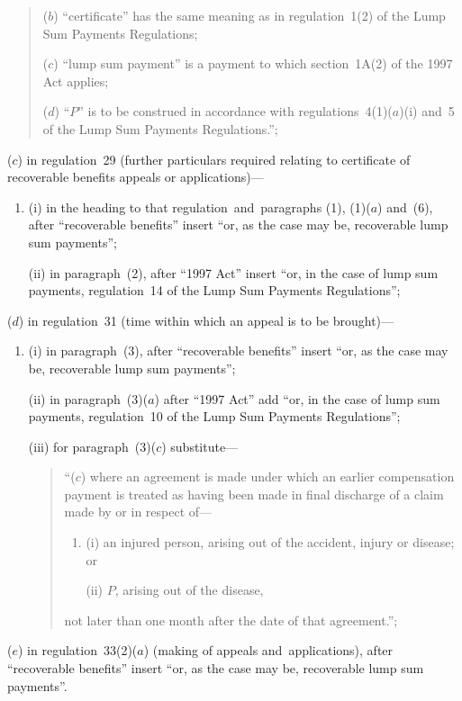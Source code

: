\documentclass[12pt,a4paper]{article}
\begin{document}
\begin{enumerate}
\begin{quotation}
\begin{enumerate}
($b$) “certificate” has the same meaning as in regulation~1(2) of the Lump Sum Payments Regulations;

($c$) “lump sum payment” is a payment to which section~1A(2) of the 1997 Act  applies;

($d$) “$P$” is to be construed in accordance with regulations~4(1)($a$)(i)  and~5 of the Lump Sum Payments Regulations.”;
\end{enumerate}
\end{quotation}

($c$) in regulation~29 (further particulars required relating to certificate of recoverable benefits appeals or applications)—
\begin{enumerate}\item[]
(i) in the heading to that regulation~and~paragraphs (1), (1)($a$)  and~(6), after “recoverable benefits” insert “or, as the case may be, recoverable lump sum payments”;

(ii) in paragraph~(2), after “1997 Act” insert “or, in the case of lump sum payments, regulation~14 of the Lump Sum Payments Regulations”;
\end{enumerate}

($d$) in regulation~31 (time within which an appeal is to be brought)—
\begin{enumerate}\item[]
(i) in paragraph~(3), after “recoverable benefits” insert “or, as the case may be, recoverable lump sum payments”;

(ii) in paragraph~(3)($a$)  after “1997 Act” add “or, in the case of lump sum payments, regulation~10 of the Lump Sum Payments Regulations”;

(iii) for paragraph~(3)($c$)  substitute—
\begin{quotation}
“($c$) where an agreement is made under which an earlier compensation payment is treated as having been made in final discharge of a claim made by or in respect of—
\begin{enumerate}\item[]
(i) an injured person, arising out of the accident, injury or disease; or

(ii) $P$, arising out of the disease,
\end{enumerate}
not later than one month after the date of that agreement.”;
\end{quotation}
\end{enumerate}

($e$) in regulation~33(2)($a$)  (making of appeals and~applications), after “recoverable benefits” insert “or, as the case may be, recoverable lump sum payments”.
\end{enumerate}
\end{document}
